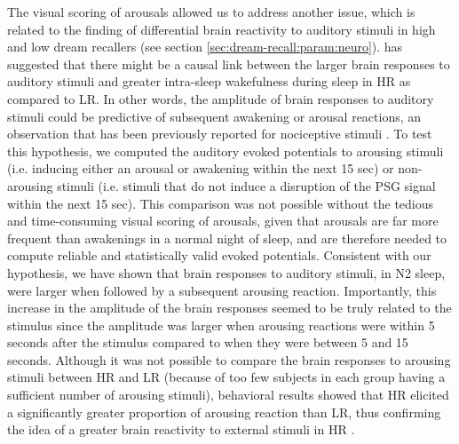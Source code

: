 The visual scoring of arousals allowed us to address another issue, which is related to the finding of differential brain reactivity to auditory stimuli in high and low dream recallers (see section \ref{sec:dream-recall:param:neuro}). \citet{eichenlaub_brain_2014} has suggested that there might be a causal link between the larger brain responses to auditory stimuli and greater intra-sleep wakefulness during sleep in HR as compared to LR. In other words, the amplitude of brain responses to auditory stimuli could be predictive of subsequent awakening or arousal reactions, an observation that has been previously reported for nociceptive stimuli \citet{bastuji_laser_2008}. To test this hypothesis, we computed the auditory evoked potentials to arousing stimuli (i.e. inducing either an arousal or awakening within the next 15 sec) or non-arousing stimuli (i.e. stimuli that do not induce a disruption of the PSG signal within the next 15 sec). This comparison was not possible without the tedious and time-consuming visual scoring of arousals, given that arousals are far more frequent than awakenings in a normal night of sleep, and are therefore needed to compute reliable and statistically valid evoked potentials. Consistent with our hypothesis, we have shown that brain responses to auditory stimuli, in N2 sleep, were larger when followed by a subsequent arousing reaction. Importantly, this increase in the amplitude of the brain responses seemed to be truly related to the stimulus since the amplitude was larger when arousing reactions were within 5 seconds after the stimulus compared to when they were between 5 and 15 seconds. Although it was not possible to compare the brain responses to arousing stimuli between HR and LR (because of too few subjects in each group having a sufficient number of arousing stimuli), behavioral results showed that HR elicited a significantly greater proportion of arousing reaction than LR, thus confirming the idea of a greater brain reactivity to external stimuli in HR \citep{eichenlaub_brain_2014}.

